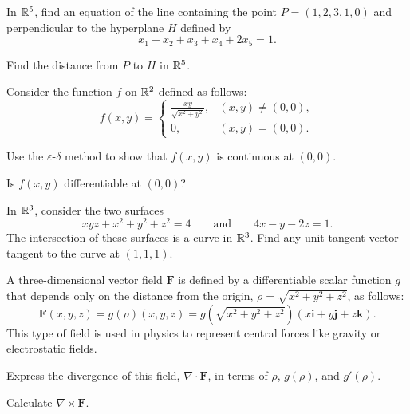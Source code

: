 \begin{problem}
\begin{problemsubparts}
\item In $\mathbb{R}^5$, find an equation of the line containing the point $P=(1, 2, 3, 1, 0)$ and perpendicular to the hyperplane $H$ defined by
\[
x_1+x_2+x_3+x_4+2x_5=1.
\]
\item Find the distance from $P$ to $H$ in $\mathbb{R}^5$.
\end{problemsubparts}
\end{problem}

\begin{problem}
Consider the function $f$ on $\mathbb{R}^2$ defined as follows:
\[
f(x, y)=
\begin{cases}
\displaystyle\frac{xy}{\sqrt{x^2+y^2}}, & (x, y)\ne(0, 0), \\[0.55em]
0, & (x, y)=(0, 0).
\end{cases}
\]
\begin{problemsubparts}
\item Use the $\varepsilon$-$\delta$ method to show that $f(x, y)$ is continuous at $(0, 0)$.
\item Is $f(x, y)$ differentiable at $(0, 0)$?
\end{problemsubparts}
\end{problem}

\begin{problem}
In $\mathbb{R}^3$, consider the two surfaces
\[
xyz+x^2+y^2+z^2=4
\qquad\text{and}\qquad
4x-y-2z=1.
\]
The intersection of these surfaces is a curve in $\mathbb{R}^3$. Find any unit tangent vector tangent to the curve at $(1, 1, 1)$.
\end{problem}

\begin{problem}
A three-dimensional vector field $\mathbf F$ is defined by a differentiable scalar function $g$ that depends only on the distance from the origin, $\rho=\sqrt{x^2+y^2+z^2}$, as follows:
\[
\mathbf F(x, y, z)=g(\rho)(x, y, z)
=g\!\left(\sqrt{x^2+y^2+z^2}\right)(x\mathbf i+y\mathbf j+z\mathbf k).
\]
This type of field is used in physics to represent central forces like gravity or electrostatic fields.
\begin{problemsubparts}
\item Express the divergence of this field, $\nabla\cdot\mathbf F$, in terms of $\rho$, $g(\rho)$, and $g'(\rho)$.
\item Calculate $\nabla\times\mathbf F$.
\end{problemsubparts}
\end{problem}


